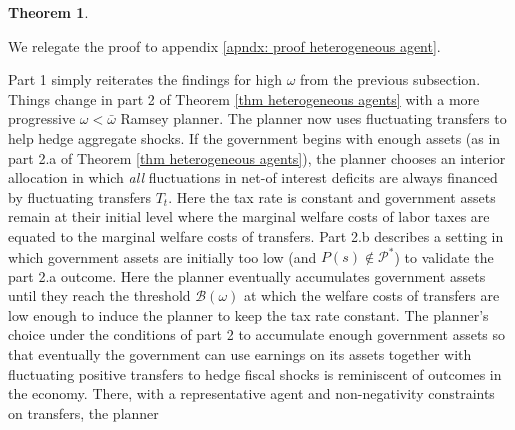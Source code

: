 \documentclass[thmsb,11pt]{article}
\newtheorem{theorem}{Theorem}
\begin{document}
\begin{theorem}
\begin{enumerate}
\begin{enumerate}
\begin{enumerate}


 \end{enumerate}

 \end{enumerate}

 \end{enumerate}


\end{theorem}



We relegate the proof to appendix \ref{apndx: proof heterogeneous agent}. 

\color{black}
 Part 1 simply reiterates the  findings for high $\omega$ from the previous subsection.
 Things change in part 2  of Theorem \ref{thm heterogeneous agents} with a more progressive  $\omega<\bar{\omega}$ Ramsey planner.
The planner now uses fluctuating transfers  to help hedge aggregate shocks.
  If the government begins with enough assets (as in part 2.a of  Theorem \ref{thm heterogeneous agents}),
   the planner
  chooses an interior allocation in which {\em all} fluctuations in net-of interest deficits are always financed by fluctuating transfers $T_t$.
   Here  the tax rate is  constant and government assets remain at their initial level where %
    the marginal welfare costs of labor taxes are equated
 to the marginal welfare costs of transfers. Part 2.b describes a setting in which  government assets are initially
 too low (and $P(s)\not \in \mathcal{P}^*$) to validate the part 2.a outcome.  Here the planner eventually accumulates government  assets until they reach the threshold $\mathcal{B}(\omega)$
at which the welfare  costs of transfers are  low enough to induce the planner to keep the tax rate constant.
The planner's choice under the conditions of part 2  to accumulate enough government assets so that
 eventually the government can use earnings on its assets together with fluctuating positive  transfers to hedge fiscal shocks is reminiscent of outcomes in the \cite{Aiyagari2002} economy. There, with a representative agent and non-negativity constraints on transfers, the planner
\end{document}
